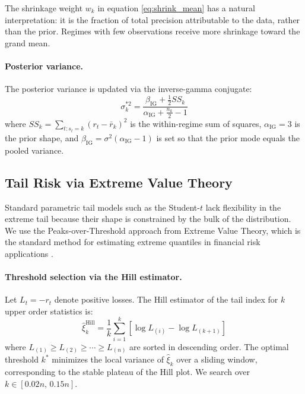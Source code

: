 \documentclass[12pt]{article}
\begin{document}
The shrinkage weight $w_k$ in equation \eqref{eq:shrink_mean} has a natural interpretation:
it is the fraction of total precision attributable to the data, rather than the prior.
Regimes with few observations receive more shrinkage toward the grand mean.

\paragraph{Posterior variance.}
The posterior variance is updated via the inverse-gamma conjugate:
\begin{equation}
  \sigma_k^{*2} = \frac{\beta_{\text{IG}} + \frac{1}{2} SS_k}
                       {\alpha_{\text{IG}} + \frac{n_k}{2} - 1}
  \label{eq:shrink_var}
\end{equation}
where $SS_k = \sum_{t: s_t = k}(r_t - \bar{r}_k)^2$ is the within-regime sum of
squares, $\alpha_{\text{IG}} = 3$ is the prior shape, and $\beta_{\text{IG}} = \sigma^2(\alpha_{\text{IG}} - 1)$
is set so that the prior mode equals the pooled variance.

\subsection{Tail Risk via Extreme Value Theory}

Standard parametric tail models such as the Student-$t$ lack flexibility in the
extreme tail because their shape is constrained by the bulk of the distribution.
We use the Peaks-over-Threshold approach from Extreme Value Theory, which is the
standard method for estimating extreme quantiles in financial risk applications
\citep{pickands1975, mcneil2000}.

\paragraph{Threshold selection via the Hill estimator.}
Let $L_t = -r_t$ denote positive losses. The Hill estimator of the tail index for
$k$ upper order statistics is:
\begin{equation}
  \hat\xi_k^{\text{Hill}} = \frac{1}{k} \sum_{i=1}^{k}
    \left[\log L_{(i)} - \log L_{(k+1)}\right]
  \label{eq:hill}
\end{equation}
where $L_{(1)} \geq L_{(2)} \geq \cdots \geq L_{(n)}$ are sorted in descending order.
The optimal threshold $k^*$ minimizes the local variance of $\hat\xi_k$ over a
sliding window, corresponding to the stable plateau of the Hill plot. We search
over $k \in [0.02n,\, 0.15n]$.
\end{document}
